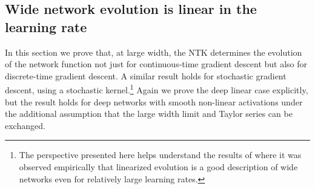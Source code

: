\documentclass[english]{article}
\newcommand{\pcite}[1]{\cite{#1}}
\begin{document}
\subsection{Wide network evolution is linear in the learning rate}\label{app:discLinEvo}

In this section we prove that, at large width, the NTK determines the evolution of the network function not just for continuous-time gradient descent but also for discrete-time gradient descent.
A similar result holds for stochastic gradient descent, using a stochastic kernel.\footnote{The perspective presented here helps understand the results of \pcite{2019arXiv190206720L} where it was observed empirically that linearized evolution is a good description of wide networks even for relatively large learning rates.}
Again we prove the deep linear case explicitly, but the result holds for deep networks with smooth non-linear activations under the additional assumption that the large width limit and Taylor series can be exchanged.
\end{document}
